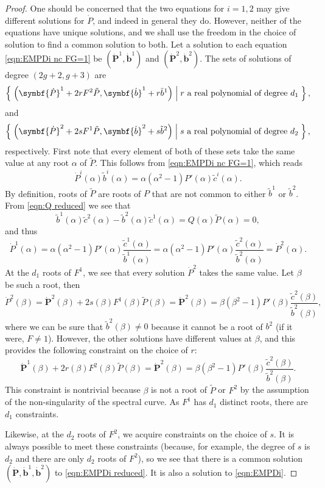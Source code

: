 \begin{lem}[Case (i)]
\begin{proof}
One should be concerned that the two equations for $i=1,2$ may give different solutions for $\dot P$, and indeed in general they do. However, neither of the equations have unique solutions, and we shall use the freedom in the choice of solution to find a common solution to both. Let a solution to each equation \eqref{eqn:EMPDi nc FG=1} be $(\symbf{\dot{P}}^1, \symbf{\dot{b}}^1)$ and $(\symbf{\dot{P}}^2, \symbf{\dot{b}}^2)$. The sets of solutions of degree $(2g+2,g+3)$ are
\[
\Set { \bra{ \symbf{\dot{P}}^1 + 2rF^2\tilde{P}, \symbf{\dot{b}}^1 + r\tilde{b}^1 } }
{ r \text{ a real polynomial of degree } d_1 },
\]
and
\[
\Set { \bra{ \symbf{\dot{P}}^2 + 2sF^1\tilde{P}, \symbf{\dot{b}}^2 + s\tilde{b}^2 } }
{ s \text{ a real polynomial of degree } d_2 },
\]
respectively. First note that every element of both of these sets take the same value at any root $α$ of $\tilde{P}$. This follows from \eqref{eqn:EMPDi nc FG=1}, which reads
\[
\dot P^i(α) \tilde{b}^i(α) = α(α^2 -1) P'(α) \tilde{c}^i(α).
\]
By definition, roots of $\tilde{P}$ are roots of $P$ that are not common to either $\tilde{b}^1$ or $\tilde{b}^2$. From \eqref{eqn:Q reduced} we see that
\[
\tilde{b}^1(α)\tilde{c}^2(α) - \tilde{b}^2(α)\tilde{c}^1(α) = Q(α)\tilde{P}(α) = 0,
\]
and thus
\[
\dot P^1(α)
= α (α^2 - 1) P'(α) \frac{\tilde{c}^1(α)}{\tilde{b}^1(α)}
= α (α^2 - 1) P'(α) \frac{\tilde{c}^2(α)}{\tilde{b}^2(α)}
= \dot P^2(α).
\]
At the $d_1$ roots of $F^1$, we see that every solution $\dot{P}^2$ takes the same value. Let $β$ be such a root, then
\[
\dot{P}^2(β)
= \symbf{\dot{P}}^2(β) + 2s(β)F^1(β)\tilde{P}(β)
= \symbf{\dot{P}}^2(β)
= β (β^2-1) P'(β) \frac{\tilde{c}^2(β)}{\tilde{b}^2(β)},
\]
where we can be sure that $\tilde{b}^2(β) \neq 0$ because it cannot be a root of $b^2$ (if it were, $F\neq 1$). However, the other solutions have different values at $β$, and this provides the following constraint on the choice of $r$:
\[
\symbf{\dot{P}}^1(β) + 2r(β)F^2(β)\tilde{P}(β) = \symbf{\dot{P}}^2(β) = β (β^2-1) P'(β) \frac{\tilde{c}^2(β)}{\tilde{b}^2(β)}.
\]
This constraint is nontrivial because $β$ is not a root of $\tilde{P}$ or $F^2$ by the assumption of the non-singularity of the spectral curve. As $F^1$ has $d_1$ distinct roots, there are $d_1$ constraints.

Likewise, at the $d_2$ roots of $F^2$, we acquire constraints on the choice of $s$. It is always possible to meet these constraints (because, for example, the degree of $s$ is $d_2$ and there are only $d_2$ roots of $F^2$), so we see that there is a common solution $(\symbf{\dot{P}}, \symbf{\dot{b}}^1, \symbf{\dot{b}}^2)$ to \eqref{eqn:EMPDi reduced}. It is also a solution to \eqref{eqn:EMPDi}.


\end{proof}
\end{lem}
